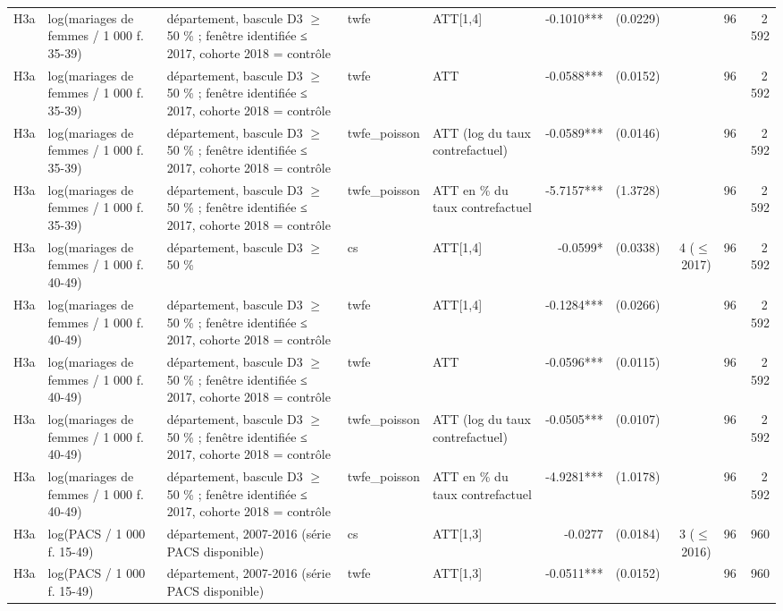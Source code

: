 \begin{table}
\begin{threeparttable}
\begin{tabular}{lp{3.8cm}p{5.5cm}lp{3.5cm}rrrrr}
H3a & log(mariages de femmes / 1 000 f. 35-39) & département, bascule D3 $\geq$ 50 \% ; fenêtre identifiée ≤ 2017, cohorte 2018 = contrôle & twfe & ATT[1,4] & -0.1010*** & (0.0229) &  & 96 & 2\,592 \\
H3a & log(mariages de femmes / 1 000 f. 35-39) & département, bascule D3 $\geq$ 50 \% ; fenêtre identifiée ≤ 2017, cohorte 2018 = contrôle & twfe & ATT & -0.0588*** & (0.0152) &  & 96 & 2\,592 \\
H3a & log(mariages de femmes / 1 000 f. 35-39) & département, bascule D3 $\geq$ 50 \% ; fenêtre identifiée ≤ 2017, cohorte 2018 = contrôle & twfe\_poisson & ATT (log du taux contrefactuel) & -0.0589*** & (0.0146) &  & 96 & 2\,592 \\
H3a & log(mariages de femmes / 1 000 f. 35-39) & département, bascule D3 $\geq$ 50 \% ; fenêtre identifiée ≤ 2017, cohorte 2018 = contrôle & twfe\_poisson & ATT en \% du taux contrefactuel & -5.7157*** & (1.3728) &  & 96 & 2\,592 \\
H3a & log(mariages de femmes / 1 000 f. 40-49) & département, bascule D3 $\geq$ 50 \% & cs & ATT[1,4] & -0.0599* & (0.0338) & 4 ($\leq$ 2017) & 96 & 2\,592 \\
H3a & log(mariages de femmes / 1 000 f. 40-49) & département, bascule D3 $\geq$ 50 \% ; fenêtre identifiée ≤ 2017, cohorte 2018 = contrôle & twfe & ATT[1,4] & -0.1284*** & (0.0266) &  & 96 & 2\,592 \\
H3a & log(mariages de femmes / 1 000 f. 40-49) & département, bascule D3 $\geq$ 50 \% ; fenêtre identifiée ≤ 2017, cohorte 2018 = contrôle & twfe & ATT & -0.0596*** & (0.0115) &  & 96 & 2\,592 \\
H3a & log(mariages de femmes / 1 000 f. 40-49) & département, bascule D3 $\geq$ 50 \% ; fenêtre identifiée ≤ 2017, cohorte 2018 = contrôle & twfe\_poisson & ATT (log du taux contrefactuel) & -0.0505*** & (0.0107) &  & 96 & 2\,592 \\
H3a & log(mariages de femmes / 1 000 f. 40-49) & département, bascule D3 $\geq$ 50 \% ; fenêtre identifiée ≤ 2017, cohorte 2018 = contrôle & twfe\_poisson & ATT en \% du taux contrefactuel & -4.9281*** & (1.0178) &  & 96 & 2\,592 \\
H3a & log(PACS / 1 000 f. 15-49) & département, 2007-2016 (série PACS disponible) & cs & ATT[1,3] & -0.0277 & (0.0184) & 3 ($\leq$ 2016) & 96 & 960 \\
H3a & log(PACS / 1 000 f. 15-49) & département, 2007-2016 (série PACS disponible) & twfe & ATT[1,3] & -0.0511*** & (0.0152) &  & 96 & 960 \\

\end{tabular}
\end{threeparttable}
\end{table}
